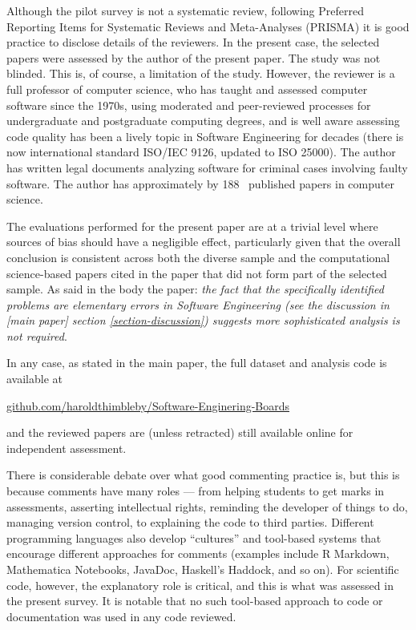 \documentclass[10pt,a4paper]{article}
\def\supplement{Supplemental Material}
\begin{document}
Although the pilot survey is not a systematic review, following Preferred Reporting Items for Systematic Reviews and Meta-Analyses (PRISMA) \cite{prisma} it is good practice to disclose details of the reviewers. In the present case, the selected papers were assessed by the author of the present paper. The study was not blinded. This is, of course, a limitation of the study. However, the reviewer is a full professor of computer science, who has taught and assessed computer software since the 1970s, using moderated and peer-reviewed processes for undergraduate and postgraduate computing degrees, and is well aware assessing code quality has been a lively topic in Software Engineering for decades (there is now international standard ISO/IEC 9126, updated to ISO 25000). The author has written legal documents analyzing software for criminal cases involving faulty software. The author has approximately 
\newcount \papers {} %
\advance \papers by 188 %
\the\papers\ published papers in computer science. 

The evaluations performed for the present paper are at a trivial level where sources of bias should have a negligible effect, particularly given that the overall conclusion is consistent across both the diverse sample and the computational science-based papers cited in the paper that did not form part of the selected sample. As said in the body the paper: \emph{the fact that the specifically identified problems are elementary errors in Software Engineering (see the discussion in \emph{[main paper]\/} section \ref{section-discussion}) suggests more sophisticated analysis is not required}. 

In any case, as stated in the main paper, the full dataset and analysis code is available at \begin{center}\url{github.com/haroldthimbleby/Software-Enginering-Boards}\end{center} and the reviewed papers are (unless retracted) still available online for independent assessment. %

There is considerable debate over what good commenting practice is, but this is because comments have many roles --- from helping students to get marks in assessments, asserting intellectual rights, reminding the developer of things to do, managing version control, to explaining the code to third parties. Different programming languages also develop ``cultures'' and tool-based systems that encourage different approaches for comments (examples include R Markdown, Mathematica Notebooks, JavaDoc, Haskell's Haddock, and so on). For scientific code, however, the explanatory role is critical, and this is what was assessed in the present survey. It is notable that no such tool-based approach to code or documentation was used in any code reviewed.
\end{document}
